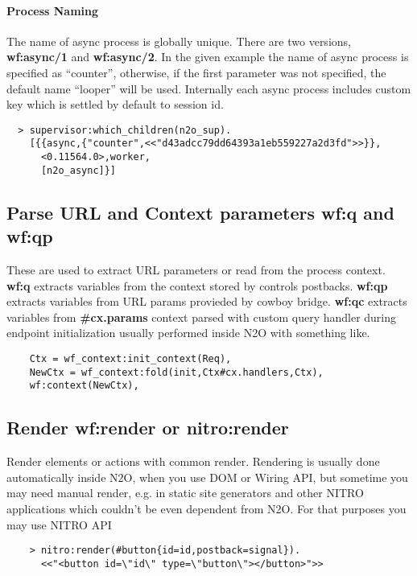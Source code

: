 \paragraph{\bf Process Naming}
The name of async process is globally unique. There are two
versions, {\bf wf:async/1} and {\bf wf:async/2}. In the given example
the name of async process is specified as ``counter'', otherwise,
if the first parameter was not specified, the default name ``looper''
will be used. Internally each async process includes custom key which is settled by
default to session id.

\begin{lstlisting}
  > supervisor:which_children(n2o_sup).
    [{{async,{"counter",<<"d43adcc79dd64393a1eb559227a2d3fd">>}},
      <0.11564.0>,worker,
      [n2o_async]}]
\end{lstlisting}

\subsection{Parse URL and Context parameters {\bf wf:q} and {\bf wf:qp}}
These are used to extract URL parameters or read from the process context.
{\bf wf:q} extracts variables from the context stored by controls postbacks.
{\bf wf:qp} extracts variables from URL params provieded by cowboy bridge.
{\bf wf:qc} extracts variables from {\bf \#cx.params} context parsed with
custom query handler during endpoint initialization usually performed
inside N2O with something like.

\vspace{1\baselineskip}
\begin{lstlisting}
    Ctx = wf_context:init_context(Req),
    NewCtx = wf_context:fold(init,Ctx#cx.handlers,Ctx),
    wf:context(NewCtx),
\end{lstlisting}
\vspace{1\baselineskip}

\newpage
\subsection{Render {\bf wf:render} or {\bf nitro:render}}
Render elements or actions with common render. Rendering is usually
done automatically inside N2O, when you use DOM or Wiring API, but sometime you may
need manual render, e.g. in static site generators and other NITRO applications
which couldn't be even dependent from N2O. For that purposes you may use NITRO API

\vspace{1\baselineskip}
\begin{lstlisting}
    > nitro:render(#button{id=id,postback=signal}).
      <<"<button id=\"id\" type=\"button\"></button>">>
\end{lstlisting}
\vspace{1\baselineskip}


